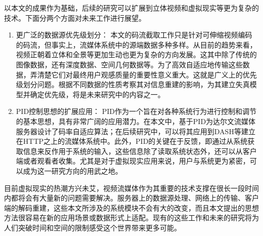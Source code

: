 以本文的成果作为基础，后续的研究可以扩展到立体视频和虚拟现实等更为复杂的技术。下面分两个方面对未来工作进行展望。
\begin{enumerate}
\item {更广泛的数据源优先级划分：}
本文的码流截取工作只是针对可伸缩视频编码的码流，但事实上，流媒体系统中的源端数据多种多样。从目前的趋势来看，视频正朝着立体和全景等更加生动也更为复杂的方向发展。这其中除了传统的图像数据，还有深度数据、空间几何数据等。为了高效自适应地传输这些数据，弄清楚它们对最终用户观感质量的重要性意义重大。这就是广义上的优先级划分问题。根据不同数据的性质考察其对信息重建的影响，为其建立失真模型并确定优先级，将是未来研究中的内容之一。
\item {PID控制思想的扩展应用：}
PID作为一个旨在对各种系统行为进行控制和调节的基本思想，具有非常广阔的应用潜力。在本文中，基于PID为达尔文流媒体服务器设计了码率自适应算法；在后续研究中，可以将其应用到DASH等建立在HTTP之上的流媒体系统中。此外，PID的关键在于反馈，即通过从系统获取信息来反作用于系统的输入，这些信息除了读取系统状态外，还可以从客户端或者观看者收集。尤其是对于虚拟现实应用来说，用户与系统更为紧密，可以成为这一研究方向的用武之地。
\end{enumerate}

目前虚拟现实的热潮方兴未艾，视频流媒体作为其重要的技术支撑在很长一段时间内都将会有大量新的问题需要解决。服务器上的数据源处理、网络上的传输、客户端的解码重建，这些本文所涉及的系统模块不会有大的改变，而且本文提出的思想方法很容易在新的应用场景或数据形式上适配。现有的这些工作和未来的研究将为人们突破时间和空间的限制感受这个世界带来更多可能。